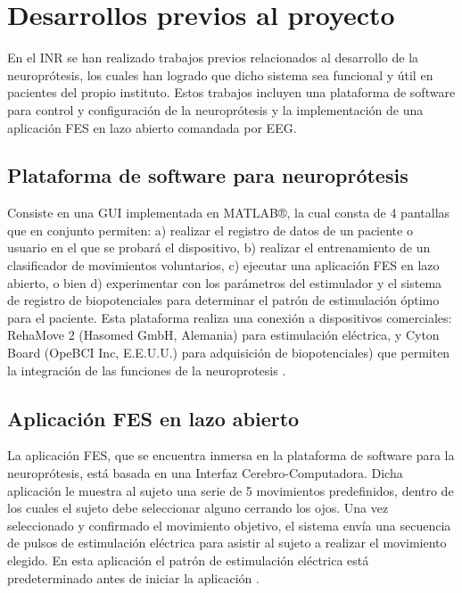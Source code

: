 \section{Desarrollos previos al proyecto}

En el INR se han realizado trabajos previos relacionados al desarrollo de la neuroprótesis, los cuales han logrado que dicho sistema sea funcional y útil en pacientes del propio instituto. Estos trabajos incluyen una plataforma de software para control y configuración de la neuroprótesis y la implementación de una aplicación FES en lazo abierto comandada por EEG.

\subsection{Plataforma de software para neuroprótesis}
Consiste en una GUI implementada en MATLAB®, la cual consta de 4 pantallas que en conjunto permiten: a) realizar el registro de datos de un paciente o usuario en el que se probará el dispositivo, b) realizar el entrenamiento de un clasificador de movimientos voluntarios, c) ejecutar una aplicación FES en lazo abierto, o bien d) experimentar con los parámetros del estimulador y el sistema de registro de biopotenciales para determinar el patrón de estimulación óptimo para el paciente. Esta plataforma realiza una conexión a dispositivos comerciales: RehaMove 2 (Hasomed GmbH, Alemania) para estimulación eléctrica, y Cyton Board (OpeBCI Inc, E.E.U.U.) para adquisición de biopotenciales) que permiten la integración de las funciones de la neuroprotesis \cite{Fuentes2018}\cite{JanethFuentes2018}.

\subsection{Aplicación FES en lazo abierto}
La aplicación FES, que se encuentra inmersa en la plataforma de software para la neuroprótesis, está basada en una Interfaz Cerebro-Computadora. Dicha aplicación le muestra al sujeto una serie de 5 movimientos predefinidos, dentro de los cuales el sujeto debe seleccionar alguno cerrando los ojos. Una vez seleccionado y confirmado el movimiento objetivo, el sistema envía una secuencia de pulsos de estimulación eléctrica para asistir al sujeto a realizar el movimiento elegido. En esta aplicación el patrón de estimulación eléctrica está predeterminado antes de iniciar la aplicación \cite{Castillo2019}\cite{OmarCastillo2019}.

